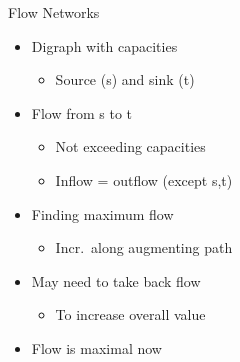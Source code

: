 \documentclass[fleqn]{beamer}
\begin{document}
{\begin{frame}{Flow Networks}
\begin{minipage}{.49\textwidth}
  \end{minipage}
  \begin{minipage}{.49\textwidth}
    \begin{itemize}
     \item<1-> Digraph with capacities
      \begin{itemize}
       \item Source (s) and sink (t)
      \end{itemize}
     \item<2-> Flow from s to t
      \begin{itemize}
       \item Not exceeding capacities
       \item Inflow = outflow (except s,t)
      \end{itemize}
     \item<3-> Finding maximum flow
      \begin{itemize}
       \item Incr.\ along augmenting path
      \end{itemize}
     \item<5-> May need to take back flow
      \begin{itemize}
       \item To increase overall value
      \end{itemize}
     \item<6-> Flow is maximal now
  
    \end{itemize}
  \end{minipage}

\end{frame}
\def\resgraph{
    \draw[resgp, bend left] (s) to node[resgp] {4} (b);
    \draw[resga, bend left] (b) to node[resga] {1} (s);
    \draw[resga] (a) to node[resga] {3} (s);
    \draw[resgp] (a) to node[resgp] {6} (c);
    \draw[resgp] (c) to node[resgp] {4} (t);
    \draw[resgp, bend left] (b) to node[resgp] {2} (d);
    \draw[resga, bend left] (d) to node[resgp] {1} (b);
    \draw[resga] (t) to node[resga] {4} (d);
    \draw[resga] (d) to node[resga] {3} (a);
}

\def\augpathres{
  \draw[aug, bend left] (s) to (b);
  \draw[aug, bend left] (b) to (d);
  \draw[aug] (d) to (a);
  \draw[aug] (a) to (c);
  \draw[aug] (c) to (t);
}


}
\end{document}
